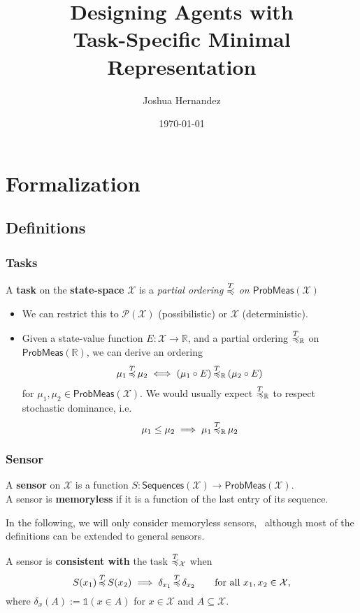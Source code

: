 \documentclass{beamer}
\title[Minimal Representation]{Designing Agents with\\ Task-Specific Minimal Representation} %
\author{Joshua Hernandez} %
\institute[UCLA] %
{
University of California, Los Angeles\\ %
\medskip
\textit{jheez@ucla.edu} %
}
\date{\today} %
\def\prob{\mathsf{ProbMeas}}
\def\seq{\mathsf{Sequences}}
\def\X{\mathcal{X}}
\def\RR{\mathbb{R}}
\def\power{\mathcal{P}}
\def\less#1{\overset{#1}{\rule{0pt}{4pt}\smash{\preccurlyeq}}}
\def\subs{\subseteq}
\begin{document}
\section{Formalization} %

\subsection{Definitions} %


\begin{frame}
\frametitle{Tasks}
\begin{definition}[Task]
A \textbf{task} on the \textbf{state-space} $\X$ is a \emph{partial ordering $\less{T}$ on $\prob(\X)$}
\end{definition}

\begin{itemize}
 \item We can restrict this to $\power(\X)$ (possibilistic) or $\X$ (deterministic).
 \item Given a state-value function $E:\X\to\RR$, and a partial ordering 
 $\less{T}_\RR$ on $\prob(\RR)$, we can derive an ordering
 $$\mu_1\,\less{T}\, \mu_2 \iff (\mu_1\circ E)\,\less{T}_\RR\,(\mu_2\circ E) $$
 for $\mu_1, \mu_2\in\prob(\X)$.  
 We would usually expect $\less{T}_\RR$ to respect stochastic dominance, i.e.
 $$\mu_1\leq\mu_2\implies\mu_1\,\less{T}_\RR\,\mu_2$$
\end{itemize}
\end{frame}




\begin{frame}
\frametitle{Sensor}
\begin{definition}[Sensor]
A \textbf{sensor} on $\X$ is a function $S:\seq(\X)\to\prob(\X)$.\\
A sensor is \textbf{memoryless} if it is a function of the last entry of its sequence.
\end{definition}
In the following, we will only consider memoryless sensors, \
although most of the definitions can be extended to general sensors.
\begin{definition}
A sensor is \textbf{consistent with} the task $\less{T}_\X$ when
$$ S({x_1})\,\less{T}\,S({x_2}) \implies \delta_{x_1}\,\less{T}\,\delta_{x_2}\qquad\text{for all $x_1,x_2\in\X$,}$$
where $\delta_x(A) := \mathds{1}(x\in A)$ for $x\in\X$ and $A\subs\X$.
\end{definition}
\end{frame}
\end{document}
